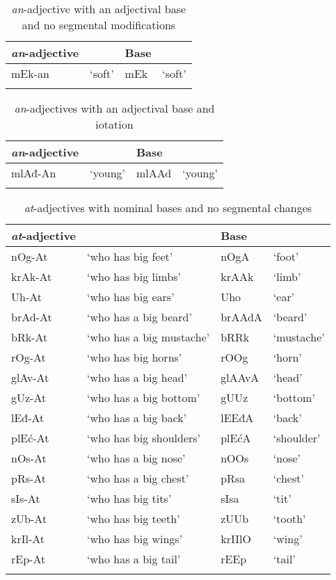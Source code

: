 \documentclass[output=paper]{langsci/langscibook}
\begin{document}
\begin{table}
\caption{\textit{an}-adjective with an adjectival base and no segmental modifications}
\label{tabapp4}
 \begin{tabular}{ l l l l}
\lsptoprule  
\textit{an}-adjective &  & Base & \\ 
\hline
mEk-an & `soft' & mEk & `soft' \\
 \lspbottomrule
 \end{tabular}
\end{table} 

\begin{table}
\caption{\textit{an}-adjectives with an adjectival base and iotation}
\label{tabapp5}
 \begin{tabular}{ l l l l}
\lsptoprule  
\textit{an}-adjective &  & Base & \\ 
\hline
mlAđ-An & `young' & mlAAd & `young' \\
 \lspbottomrule
 \end{tabular}
\end{table} 

\begin{table}
\caption{\textit{at}-adjectives with nominal bases and no segmental changes}
\label{tabapp6}          
 \begin{tabular}{ l l l l}          
\lsptoprule            
\textit{at}-adjective &  & Base &    \\  
\hline
nOg-At & `who has big feet' & nOgA & `foot' 
\\  krAk-At & `who has big limbs' & krAAk & `limb' 
\\  Uh-At & `who has big ears' & Uho & `ear' 
\\  brAd-At & `who has a big beard' & brAAdA & `beard' 
\\  bRk-At & `who has a big mustache' & bRRk & `mustache' 
\\  rOg-At & `who has big horns' & rOOg & `horn' 
\\  glAv-At & `who has a big head' & glAAvA & `head' 
\\  gUz-At & `who has a big bottom' & gUUz & `bottom' 
\\  lEđ-At & `who has a big back' & lEEđA & `back' 
\\  plEć-At & `who has big shoulders' & plEćA & `shoulder' 
\\  nOs-At & `who has a big nose' & nOOs & `nose' 
\\  pRs-At & `who has a big chest' & pRsa & `chest' 
\\  sIs-At & `who has big tits' & sIsa & `tit' 
\\  zUb-At & `who has big teeth' & zUUb & `tooth' 
\\  krIl-At & `who has big wings' & krIIlO & `wing' 
\\  rEp-At & `who has a big tail' & rEEp & `tail' \\
 \lspbottomrule         
 \end{tabular}          
\end{table}           
          
\end{document}

